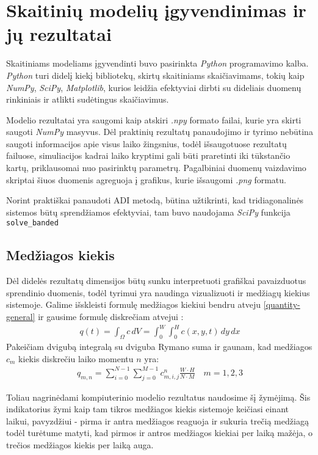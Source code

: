\section{Skaitinių modelių įgyvendinimas ir jų rezultatai}

Skaitiniams modeliams įgyvendinti buvo pasirinkta \textit{Python} programavimo kalba. \textit{Python} turi didelį kiekį bibliotekų, skirtų skaitiniams skaičiavimams, tokių kaip \textit{NumPy}, \textit{SciPy}, \textit{Matplotlib}, kurios leidžia efektyviai dirbti su dideliais duomenų rinkiniais ir atlikti sudėtingus skaičiavimus.

Modelio rezultatai yra saugomi kaip atskiri \textit{.npy} formato failai, kurie yra skirti saugoti \mbox{\textit{NumPy}} masyvus. Dėl praktinių rezultatų panaudojimo ir tyrimo nebūtina saugoti informacijos apie visus laiko žingsnius, todėl išsaugotuose rezultatų failuose, simuliacijos kadrai laiko kryptimi gali būti praretinti iki tūkstančio kartų, priklausomai nuo pasirinktų parametrų. Pagalbiniai duomenų vaizdavimo skriptai šiuos duomenis agreguoja į grafikus, kurie išsaugomi \textit{.png} formatu.

Norint praktiškai panaudoti ADI metodą, būtina užtikrinti, kad tridiagonalinės sistemos būtų sprendžiamos efektyviai, tam buvo naudojama \textit{SciPy} funkcija \texttt{solve\_banded}

\subsection*{Medžiagos kiekis}

Dėl didelės rezultatų dimensijos būtų sunku interpretuoti grafiškai pavaizduotus sprendinio duomenis, todėl tyrimui yra naudinga vizualizuoti ir medžiagų kiekius sistemoje. Galime išskleisti formulę medžiagos kiekiui bendru atveju \eqref{quantity-general} ir gausime formulę diskrečiam atvejui \cite{strangCalculusVolume32016}:
\begin{align}
    q(t) = \int_\Omega c\,dV = \int_0^W \int_0^H c(x, y, t)\,dy\,dx
\end{align}
Pakeičiam dvigubą integralą su dviguba Rymano suma ir gaunam, kad medžiagos $c_m$ kiekis diskrečiu laiko momentu $n$ yra:
\begin{align}
    q_{m, n}= \sum_{i=0}^{N-1}\sum_{j=0}^{M-1} c_{m, i,j}^n \frac{W\cdot H}{N\cdot M} \quad m=1, 2, 3
\end{align}

Toliau nagrinėdami kompiuterinio modelio rezultatus naudosime šį žymėjimą. Šis indikatorius žymi kaip tam tikros medžiagos kiekis sistemoje keičiasi einant laikui, pavyzdžiui - pirma ir antra medžiagos reaguoja ir sukuria trečią medžiagą todėl turėtume matyti, kad pirmos ir antros medžiagos kiekiai per laiką mažėja, o trečios medžiagos kiekis per laiką auga.

